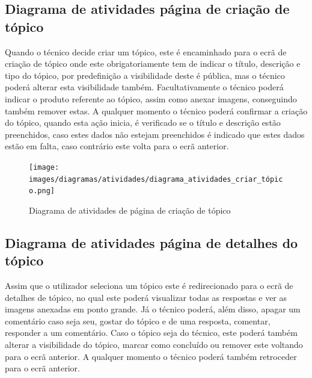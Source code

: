 \newpage

\subsection{Diagrama de atividades página de criação de tópico}

Quando o técnico decide criar um tópico, este é encaminhado para o ecrã de criação de tópico 
onde este obrigatoriamente tem de indicar o título, descrição e tipo do tópico, por predefinição a 
visibilidade deste é pública, mas o técnico poderá alterar esta visibilidade também. 
Facultativamente o técnico poderá indicar o produto referente ao tópico, 
assim como anexar imagens, conseguindo também remover estas. A qualquer momento o técnico poderá 
confirmar a criação do tópico, quando esta ação inicia, é verificado se o título e descrição estão 
preenchidos, caso estes dados não estejam preenchidos é indicado que estes dados estão em falta, 
caso contrário este volta para o ecrã anterior.

\begin{figure}[htb]
    \centering
    \texttt{[image: images/diagramas/atividades/diagrama\_atividades\_criar\_tópico.png]}
    \caption{Diagrama de atividades de página de criação de tópico}
    \label{fig:24}
\end{figure}

\newpage

\subsection{Diagrama de atividades página de detalhes do tópico}

Assim que o utilizador seleciona um tópico este é redirecionado para o ecrã de detalhes de tópico, 
no qual este poderá visualizar todas as respostas e ver as imagens anexadas em ponto grande.
Já o técnico poderá, além disso, apagar um comentário caso seja seu, gostar do tópico e de uma resposta, 
comentar, responder a um comentário. Caso o tópico seja do técnico, este poderá também alterar a 
visibilidade do tópico, marcar como concluído ou remover este voltando para o ecrã anterior. 
A qualquer momento o técnico poderá também retroceder para o ecrã anterior.

